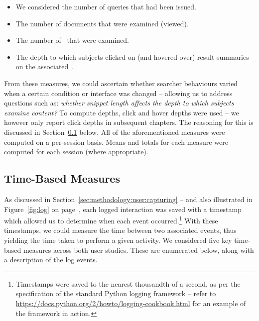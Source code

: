 \begin{itemize}
    \item{ We considered the number of queries that had been issued.}
    \item{ The number of documents that were examined (viewed).}
    \item{ The number of~ that were examined.}
    \item{ The depth to which subjects clicked on (and hovered over) result summaries on the associated~.}
\end{itemize}

From these measures, we could ascertain whether searcher behaviours varied when a certain condition or interface was changed -- allowing us to address questions such as: \emph{whether snippet length affects the depth to which subjects examine content?} To compute depths, click and hover depths were used -- we however only report click depths in subsequent chapters. The reasoning for this is discussed in Section~\ref{sec:methodology:extracting:time} below. All of the aforementioned measures were computed on a per-session basis. Means and totals for each measure were computed for each session (where appropriate).


\subsection{Time-Based Measures}\label{sec:methodology:extracting:time}
As discussed in Section~\ref{sec:methodology:user:capturing} -- and also illustrated in Figure~\ref{fig:log} on page~\pageref{fig:log}, each logged interaction was saved with a timestamp which allowed us to determine when each event occurred.\footnote{Timestamps were saved to the nearest thousandth of a second, as per the specification of the standard Python logging framework -- refer to \url{https://docs.python.org/2/howto/logging-cookbook.html}  for an example of the framework in action.} With these timestamps, we could measure the time between two associated events, thus yielding the time taken to perform a given activity. We considered five key time-based measures across both user studies. These are enumerated below, along with a description of the log events.

